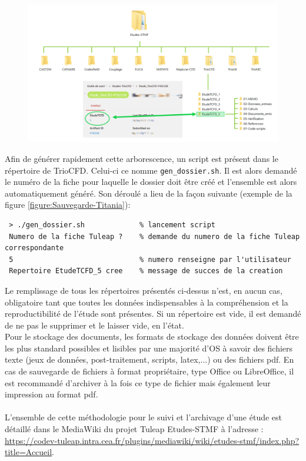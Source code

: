\begin{figure}[H]
   \centering
   \includegraphics[width=14.5cm]{pictures/Sauvegarde-Titania.png}
   \vspace*{0.2cm}
\end{figure}
\vspace{0.2cm}
Afin de générer rapidement cette arborescence, un script est présent dans le répertoire de TrioCFD. Celui-ci ce nomme \texttt{gen\_dossier.sh}. Il est alors demandé le numéro de la fiche pour laquelle le dossier doit être créé et l'ensemble est alors automatiquement généré. Son déroulé a lieu de la façon suivante (exemple de la figure \ref{figure:Sauvegarde-Titania}):

\footnotesize
\begin{lstlisting}
 > ./gen_dossier.sh             % lancement script
 Numero de la fiche Tuleap ?    % demande du numero de la fiche Tuleap correspondante
 5                              % numero renseigne par l'utilisateur
 Repertoire EtudeTCFD_5 cree    % message de succes de la creation
\end{lstlisting}
\normalsize
Le remplissage de tous les répertoires présentés ci-dessus n'est, en aucun cas, obligatoire tant que toutes les données indispensables à la compréhension et la reproductibilité de l'étude sont présentes. Si un répertoire est vide, il est demandé de ne pas le supprimer et le laisser vide, en l'état.\\
Pour le stockage des documents, les formats de stockage des données doivent être les plus standard possibles et lisibles par une majorité d'OS à savoir des fichiers texte (jeux de données, post-traitement, scripts, latex,...) ou des fichiers pdf. En cas de  sauvegarde de fichiers à format propriétaire, type Office ou LibreOffice, il est recommandé d'archiver à la fois ce type de fichier mais également leur impression au format pdf.\\
\\
L'ensemble de cette méthodologie pour le suivi et l'archivage d'une étude est détaillé dans le MediaWiki du projet Tuleap Etudes-STMF à l'adresse : \url{https://codev-tuleap.intra.cea.fr/plugins/mediawiki/wiki/etudes-stmf/index.php?title=Accueil}.

